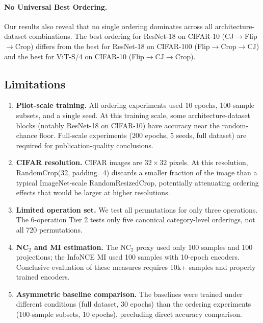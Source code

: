 \documentclass{article}
\begin{document}
\paragraph{No Universal Best Ordering.}
Our results also reveal that no single ordering dominates across all architecture-dataset combinations. The best ordering for ResNet-18 on CIFAR-10 (CJ$\to$Flip$\to$Crop) differs from the best for ResNet-18 on CIFAR-100 (Flip$\to$Crop$\to$CJ) and the best for ViT-S/4 on CIFAR-10 (Flip$\to$CJ$\to$Crop).

\subsection{Limitations}

\begin{enumerate}
\item \textbf{Pilot-scale training.} All ordering experiments used 10 epochs, 100-sample subsets, and a single seed. At this training scale, some architecture-dataset blocks (notably ResNet-18 on CIFAR-10) have accuracy near the random-chance floor. Full-scale experiments (200 epochs, 5 seeds, full dataset) are required for publication-quality conclusions.

\item \textbf{CIFAR resolution.} CIFAR images are $32 \times 32$ pixels. At this resolution, RandomCrop(32, padding=4) discards a smaller fraction of the image than a typical ImageNet-scale RandomResizedCrop, potentially attenuating ordering effects that would be larger at higher resolutions.

\item \textbf{Limited operation set.} We test all permutations for only three operations. The 6-operation Tier 2 tests only five canonical category-level orderings, not all 720 permutations.

\item \textbf{NC$_2$ and MI estimation.} The NC$_2$ proxy used only 100 samples and 100 projections; the InfoNCE MI used 100 samples with 10-epoch encoders. Conclusive evaluation of these measures requires 10k+ samples and properly trained encoders.

\item \textbf{Asymmetric baseline comparison.} The baselines were trained under different conditions (full dataset, 30 epochs) than the ordering experiments (100-sample subsets, 10 epochs), precluding direct accuracy comparison.
\end{enumerate}
\end{document}
